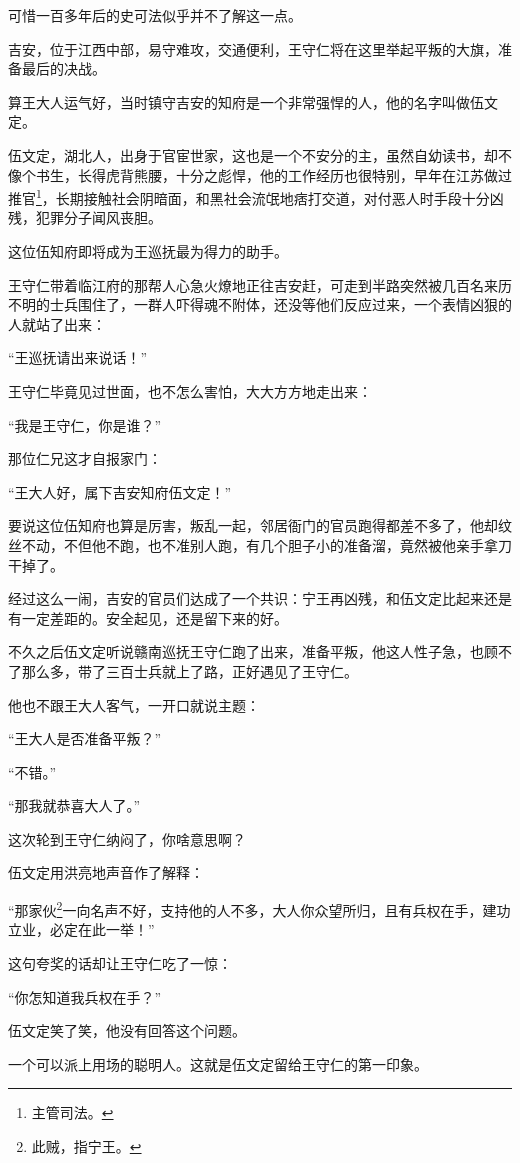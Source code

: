 \begin{multicols}{\theparacolNo}
可惜一百多年后的史可法似乎并不了解这一点。

吉安，位于江西中部，易守难攻，交通便利，王守仁将在这里举起平叛的大旗，准备最后的决战。

算王大人运气好，当时镇守吉安的知府是一个非常强悍的人，他的名字叫做伍文定。

伍文定，湖北人，出身于官宦世家，这也是一个不安分的主，虽然自幼读书，却不像个书生，长得虎背熊腰，十分之彪悍，他的工作经历也很特别，早年在江苏做过推官\footnote{主管司法。}，长期接触社会阴暗面，和黑社会流氓地痞打交道，对付恶人时手段十分凶残，犯罪分子闻风丧胆。

这位伍知府即将成为王巡抚最为得力的助手。

王守仁带着临江府的那帮人心急火燎地正往吉安赶，可走到半路突然被几百名来历不明的士兵围住了，一群人吓得魂不附体，还没等他们反应过来，一个表情凶狠的人就站了出来：

“王巡抚请出来说话！”

王守仁毕竟见过世面，也不怎么害怕，大大方方地走出来：

“我是王守仁，你是谁？”

那位仁兄这才自报家门：

“王大人好，属下吉安知府伍文定！”

要说这位伍知府也算是厉害，叛乱一起，邻居衙门的官员跑得都差不多了，他却纹丝不动，不但他不跑，也不准别人跑，有几个胆子小的准备溜，竟然被他亲手拿刀干掉了。

经过这么一闹，吉安的官员们达成了一个共识：宁王再凶残，和伍文定比起来还是有一定差距的。安全起见，还是留下来的好。

不久之后伍文定听说赣南巡抚王守仁跑了出来，准备平叛，他这人性子急，也顾不了那么多，带了三百士兵就上了路，正好遇见了王守仁。

他也不跟王大人客气，一开口就说主题：

“王大人是否准备平叛？”

“不错。”

“那我就恭喜大人了。”

这次轮到王守仁纳闷了，你啥意思啊？

伍文定用洪亮地声音作了解释：

“那家伙\footnote{此贼，指宁王。}一向名声不好，支持他的人不多，大人你众望所归，且有兵权在手，建功立业，必定在此一举！”

这句夸奖的话却让王守仁吃了一惊：

“你怎知道我兵权在手？”

伍文定笑了笑，他没有回答这个问题。

一个可以派上用场的聪明人。这就是伍文定留给王守仁的第一印象。


\end{multicols}
